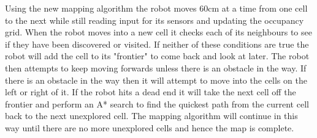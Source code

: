 \documentclass{article}
\begin{document}
Using the new mapping algorithm the robot moves 60cm at a time from one cell to the next while still reading input for its sensors and updating the occupancy grid. When the robot moves into a new cell it checks each of its neighbours to see if they have been discovered or visited. If neither of these conditions are true the robot will add the cell to its "frontier" to come back and look at later. The robot then attempts to keep moving forwards unless there is an obstacle in the way. If there is an obstacle in the way then it will attempt to move into the cells on the left or right of it. If the robot hits a dead end it will take the next cell off the frontier and perform an A* search to find the quickest path from the current cell back to the next unexplored cell. The mapping algorithm will continue in this way until there are no more unexplored cells and hence the map is complete.
\end{document}
